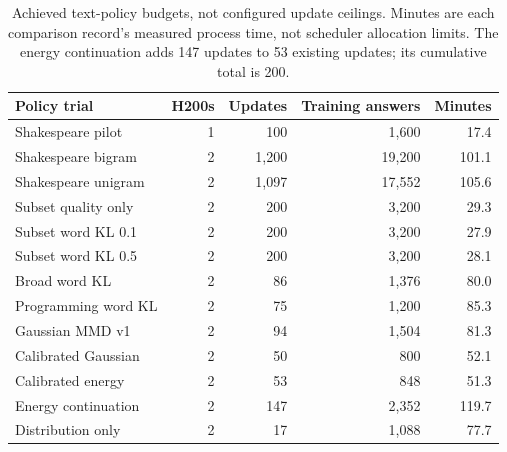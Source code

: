 \begin{table}[htbp]
\centering\footnotesize
\caption{Achieved text-policy budgets, not configured update ceilings. Minutes are each comparison record's measured process time, not scheduler allocation limits. The energy continuation adds 147 updates to 53 existing updates; its cumulative total is 200.}\label{tab:text-inventory-new}
\begin{tabular}{@{}lrrrr@{}}
\toprule
Policy trial & H200s & Updates & Training answers & Minutes\\
\midrule
Shakespeare pilot & 1 & 100 & 1,600 & 17.4\\
Shakespeare bigram & 2 & 1,200 & 19,200 & 101.1\\
Shakespeare unigram & 2 & 1,097 & 17,552 & 105.6\\
Subset quality only & 2 & 200 & 3,200 & 29.3\\
Subset word KL 0.1 & 2 & 200 & 3,200 & 27.9\\
Subset word KL 0.5 & 2 & 200 & 3,200 & 28.1\\
Broad word KL & 2 & 86 & 1,376 & 80.0\\
Programming word KL & 2 & 75 & 1,200 & 85.3\\
Gaussian MMD v1 & 2 & 94 & 1,504 & 81.3\\
Calibrated Gaussian & 2 & 50 & 800 & 52.1\\
Calibrated energy & 2 & 53 & 848 & 51.3\\
Energy continuation & 2 & 147 & 2,352 & 119.7\\
Distribution only & 2 & 17 & 1,088 & 77.7\\
\bottomrule
\end{tabular}
\end{table}
